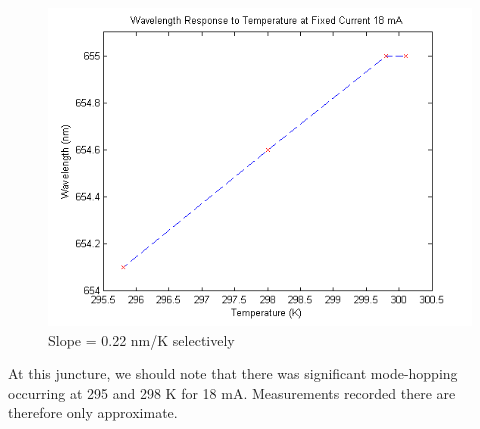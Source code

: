 \documentclass[10pt,a4paper]{article}
\begin{document}
\begin{figure}[H]
\centering
\includegraphics[scale = 0.8]{../Analysis/wavelength-temperature.png}
\caption{Slope = 0.22 nm/K selectively}
\end{figure}
\noindent At this juncture, we should note that there was significant mode-hopping occurring at 295 and 298 K for 18 mA. Measurements recorded there are therefore only approximate.
\end{document}
